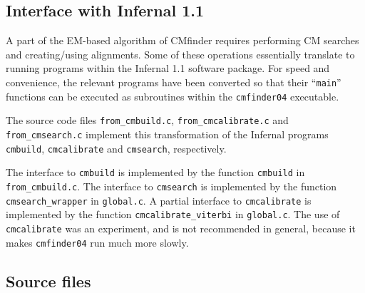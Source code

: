 \documentclass[letterpaper,12pt]{report}
\begin{document}
\subsection{Interface with Infernal 1.1}

A part of the EM-based algorithm of CMfinder requires performing CM searches and creating/using alignments.  Some of these operations essentially translate to running programs within the Infernal 1.1 software package.  For speed and convenience, the relevant programs have been converted so that their ``{\tt main}'' functions can be executed as subroutines within the {\tt cmfinder04} executable.

The source code files {\tt from\_cmbuild.c}, {\tt from\_cmcalibrate.c} and {\tt from\_cmsearch.c} implement this transformation of the Infernal programs {\tt cmbuild}, {\tt cmcalibrate} and {\tt cmsearch}, respectively.

The interface to {\tt cmbuild} is implemented by the function {\tt cmbuild} in {\tt from\_cmbuild.c}.  The interface to {\tt cmsearch} is implemented by the function {\tt cmsearch\_wrapper} in {\tt global.c}.  A partial interface to {\tt cmcalibrate} is implemented by the function {\tt cmcalibrate\_viterbi} in {\tt global.c}.  The use of {\tt cmcalibrate} was an experiment, and is not recommended in general, because it makes {\tt cmfinder04} run much more slowly.

\subsection{Source files}
\end{document}
